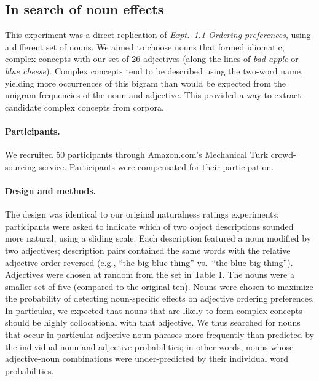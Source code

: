 \documentclass[12pt]{article}
\newcommand{\jd}[1]{\textcolor{red}{[jd: #1]}}
\begin{document}
\subsection{In search of noun effects}

This experiment was a direct replication of \emph{Expt.~1.1 Ordering preferences}, using a different set of nouns. We aimed to choose nouns that formed idiomatic, complex concepts with our set of 26 adjectives (along the lines of \emph{bad apple} or \emph{blue cheese}).  %
Complex concepts tend to be described using the two-word name, yielding more occurrences of this bigram than would be expected from the unigram frequencies of the noun and adjective. This provided a way to extract candidate complex concepts from corpora.


\paragraph{Participants.}

We recruited 50 participants through Amazon.com's Mechanical Turk crowd-sourcing service. Participants were compensated for their participation.

\paragraph{Design and methods.}

The design was identical to our original naturalness ratings experiments: participants were asked to indicate which of two object descriptions sounded more natural, using a sliding scale. Each description featured a noun modified by two adjectives; description pairs contained the same words with the relative adjective order reversed (e.g., ``the big blue thing'' vs.~``the blue big thing''). Adjectives were chosen at random from the set in Table 1. The nouns were a smaller set of five (compared to the original ten). Nouns were chosen to maximize the probability of detecting noun-specific effects on adjective ordering preferences. In particular, we expected that nouns that are likely to form complex concepts should be 
highly collocational with that adjective. We thus searched for nouns that occur in particular adjective-noun phrases more frequently than predicted by the individual noun and adjective probabilities; in other words, nouns whose adjective-noun combinations were under-predicted by their individual word probabilities. 
\end{document}
